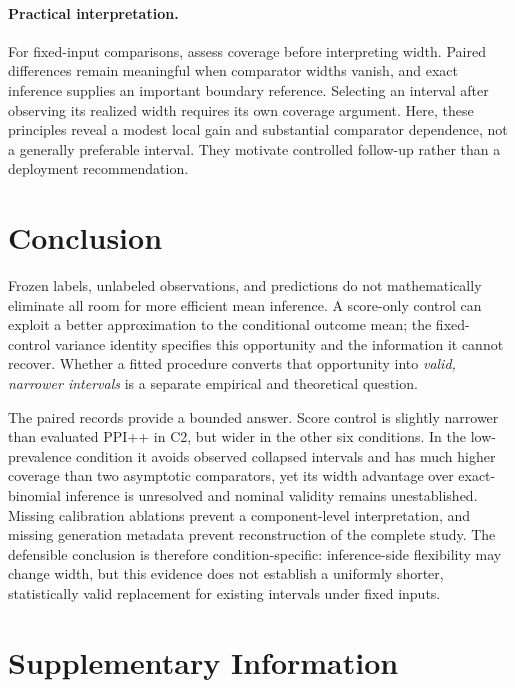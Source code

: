 \documentclass{article}
\begin{document}
\paragraph{Practical interpretation.}
For fixed-input comparisons, assess coverage before interpreting width. Paired differences remain meaningful when comparator widths vanish, and exact inference supplies an important boundary reference. Selecting an interval after observing its realized width requires its own coverage argument. Here, these principles reveal a modest local gain and substantial comparator dependence, not a generally preferable interval. They motivate controlled follow-up rather than a deployment recommendation.

\section{Conclusion}
Frozen labels, unlabeled observations, and predictions do not mathematically eliminate all room for more efficient mean inference. A score-only control can exploit a better approximation to the conditional outcome mean; the fixed-control variance identity specifies this opportunity and the information it cannot recover. Whether a fitted procedure converts that opportunity into \emph{valid, narrower intervals} is a separate empirical and theoretical question.

The paired records provide a bounded answer. Score control is slightly narrower than evaluated PPI++ in C2, but wider in the other six conditions. In the low-prevalence condition it avoids observed collapsed intervals and has much higher coverage than two asymptotic comparators, yet its width advantage over exact-binomial inference is unresolved and nominal validity remains unestablished. Missing calibration ablations prevent a component-level interpretation, and missing generation metadata prevent reconstruction of the complete study. The defensible conclusion is therefore condition-specific: inference-side flexibility may change width, but this evidence does not establish a uniformly shorter, statistically valid replacement for existing intervals under fixed inputs.

\clearpage



\clearpage
\appendix
\section{Supplementary Information}
\end{document}
